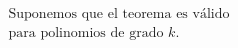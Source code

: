 \documentclass[preview]{standalone}
\begin{document}
\begin{align*}
\text{Suponemos que el teorema es válido}\\ \text{para polinomios de grado }k\text{.}
\end{align*}
\end{document}
